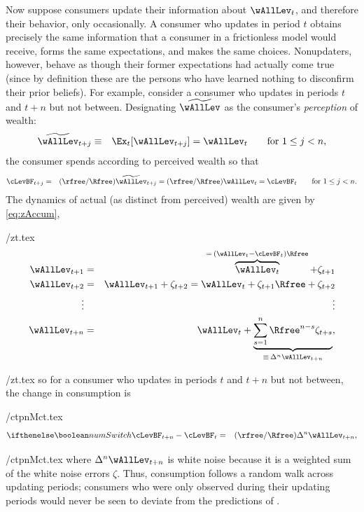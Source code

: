 \documentclass[titlepage]{\econtex}\newcommand{\texname}{cAndCwithStickyE}
\begin{document}
Now suppose consumers update their information about $\wAllLev_t$, and therefore their behavior, only occasionally.  A consumer who updates in period $t$ obtains precisely the same information that a consumer in a frictionless model would receive, forms the same expectations, and makes the same choices.  Nonupdaters, however, behave as though their former expectations had actually come true (since by definition these are the persons who have learned nothing to disconfirm their prior beliefs).  For example, consider a consumer who updates in periods $t$ and $t+n$ but not between.  Designating $\perc{\wAllLev}$ as the consumer's {\it perception} of wealth:
  \begin{eqnarray*}
\perc{\wAllLev}_{t+j} & \equiv & \Ex_{t}[\wAllLev_{t+j}] = \wAllLev_{t} \qquad \text{for }  1\le j < n,
\end{eqnarray*}
  the consumer spends according to perceived wealth so that
  \begin{eqnarray*}
\cLevBF_{t+j} & = & (\rfree/\Rfree)\perc{\wAllLev}_{t+j} = (\rfree/\Rfree)     \wAllLev _{t} = \cLevBF_{t} \qquad \text{for }  1\le j < n.
\end{eqnarray*}
The dynamics of actual (as distinct from perceived) wealth are given by \eqref{eq:zAccum},
\begin{verbatimwrite}{\eq/zt.tex}
\begin{eqnarray*}
        \wAllLev_{t+1} & = & \overbrace{\wAllLev_{t}}^{=\,(\wAllLev_{t}-\cLevBF_{t})\Rfree}+\zeta_{t+1}  \\
        \wAllLev_{t+2} & = & \wAllLev_{t+1}+\zeta_{t+2}=\wAllLev_{t}+\zeta_{t+1}\Rfree + \zeta_{t+2}
\\ \vdots       &   & \vdots \nonumber
\\  \wAllLev_{t+n} & = & \wAllLev_{t}+\underbrace{\sum_{s=1}^{n} \Rfree^{n-s}\zeta_{t+s}}_{\equiv\,\Delta^{n} \wAllLev_{t+n}},
\end{eqnarray*}
\end{verbatimwrite}
 \eq/zt.tex
so for a consumer who updates in periods $t$ and $t+n$ but not between, the change in consumption is
\begin{verbatimwrite}{\eq/ctpnMct.tex}
\begin{eqnarray*}
\ifnumSw        \cLevBF_{t+n}-\cLevBF_{t}  & = & (\rfree/\Rfree)\Delta^{n}\wAllLev_{t+n},
\end{eqnarray*}
\end{verbatimwrite}
 {\eq/ctpnMct.tex} where $\Delta^{n}\wAllLev_{t+n}$ is white noise because it is a weighted sum of the white noise errors $\zeta$.  Thus, consumption follows a random walk across updating periods; consumers who were only observed during their updating periods would never be seen to deviate from the predictions of \cite{hallRandomWalk}.
\end{document}
